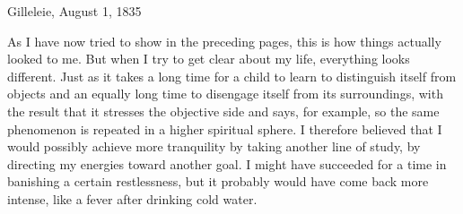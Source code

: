   \begin{flushright} 
 Gilleleie, August 1, 1835 
 \end{flushright}


  As I have now tried to show in the preceding pages, this is how things actually looked to me. 
 But when I try to get clear about my life, everything looks different. 
 Just as it takes a long time for a child to learn to distinguish itself from objects and an equally long time to disengage itself from its surroundings, with the result that it stresses the objective side and says, for example,  so the same phenomenon is repeated in a higher spiritual sphere. 
 I therefore believed that I would possibly achieve more tranquility by taking another line of study, by directing my energies toward another goal. 
 I might have succeeded for a time in banishing a certain restlessness, but it probably would have come back more intense, like a fever after drinking cold water.


